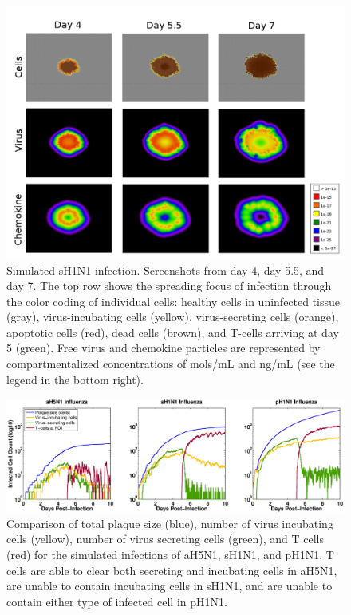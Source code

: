 \documentclass[10pt]{article}
\begin{document}
\begin{figure}[ht!]
\begin{center}
 \includegraphics[width=\textwidth]{cycells}
 \end{center}
\caption{Simulated sH1N1 infection. Screenshots from day 4, day 5.5, and day 7.  The top row shows the spreading focus of infection  through the color coding of individual cells:  healthy cells in uninfected tissue (gray),  virus-incubating cells (yellow), virus-secreting cells (orange), apoptotic cells (red), dead cells (brown), and T-cells arriving at day 5 (green).  Free virus and chemokine particles are represented by compartmentalized concentrations of mols/mL and ng/mL (see the legend in the bottom right).} 
 \label{fig:cycells}
\end{figure}


\begin{figure}[ht!]
\begin{center}
 \includegraphics[width=\textwidth]{plaquesize}
 \end{center}
\caption{Comparison of total plaque size (blue), number of virus incubating cells (yellow), number of virus secreting cells (green), and T cells (red) for the simulated infections of aH5N1, sH1N1, and pH1N1.  T cells are able to clear both secreting and incubating cells in aH5N1, are unable to contain incubating cells in sH1N1, and are unable to contain either type of infected cell in pH1N1.} 
 \label{fig:plaquesize}
\end{figure}
\end{document}
